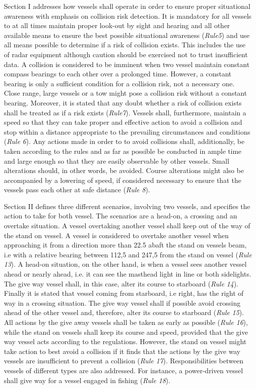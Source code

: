 Section I addresses how vessels shall operate in order to ensure proper situational awareness with emphasis on collision risk detection.  It is mandatory for  all vessels to at all times maintain proper look-out by sight and hearing and all other available means to ensure the best possible situational awareness (\textit{Rule5}) and use all means possible to determine if a risk of collision exists. This includes the use of radar equipment although caution should be exercised not to trust insufficient data. A collision is considered to be imminent when two vessel maintain constant compass bearings to each other over a prolonged time.
However, a constant bearing is only a sufficient condition for a collision risk, not a necessary one. Close range, large vessels or a tow might pose a collision risk without a constant bearing. Moreover, it is stated that any doubt whether a risk of collision exists shall be treated as if a risk exists (\textit{Rule7}).
Vessels shall, furthermore, maintain a speed so that they can take proper and effective action to avoid a collision and stop within a distance appropriate to the prevailing circumstances and conditions (\textit{Rule 6}). Any actions made in order to to avoid collisions shall, additionally, be taken according to the rules and as far as possible be conducted in ample time and large enough so that they are easily observable by other vessels. Small alterations should, in other words, be avoided. Course alterations might also be accompanied by a lowering of speed, if considered necessary to ensure that the vessels pass each other at safe distance (\textit{Rule 8}).

Section II defines three different scenarios, involving two vessels, and specifies the action to take for both vessel. The scenarios are a head-on, a crossing and an overtake situation. A vessel overtaking another vessel shall keep out of the way of the stand on vessel. A vessel is considered to overtake another vessel when approaching it from a direction more than 22.5 \textdegree abaft the stand on vessels beam, i.e with a relative bearing between 112,5 \textdegree and 247,5 \textdegree from the stand on vessel (\textit{Rule 13}). A head-on situation, on the other hand, is when a vessel sees another vessel ahead or nearly ahead, i.e. it can see the masthead light in line or both sidelights. The give way vessel shall, in this case, alter its course to starboard (\textit{Rule 14}). Finally it is stated that vessel coming from starboard, i.e right, has the right of way in a crossing situation. The give way vessel shall if possible avoid crossing ahead of the other vessel and, therefore, alter its course to starboard  (\textit{Rule 15}). All actions by the give away vessels shall be taken as early as possible  (\textit{Rule 16}), while the stand on vessels shall keep its course and speed, provided that the give way vessel acts according to the regulations. However, the stand on vessel might take action to best avoid a collision if it finds that the actions by the give way vessels are insufficient to prevent a collision  (\textit{Rule 17}). Responsibilities between vessels of different types are also addressed. For instance, a power-driven vessel shall give way for a vessel engaged in fishing  (\textit{Rule 18}).

